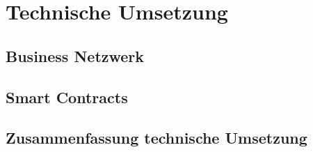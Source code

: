 \section{Technische Umsetzung}

\subsection{Business Netzwerk}

\subsection{Smart Contracts}

\subsection{Zusammenfassung technische Umsetzung}

\newpage

